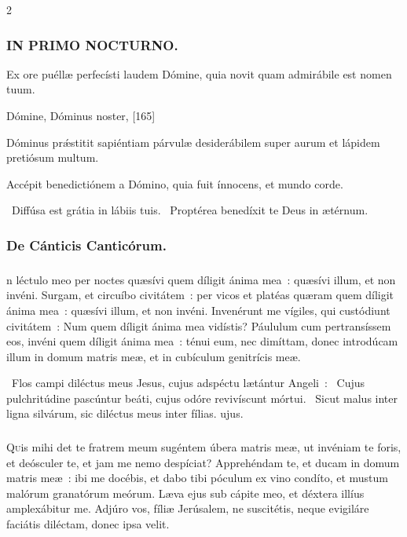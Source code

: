 \documentclass[9pt,twoside]{extarticle}
\begin{document}
\begin{multicols}{2}
{\subsubsection*{\center \textsc{IN PRIMO NOCTURNO.}}
\begin{tightlist}{}
\item {} Ex ore puéllæ perfecísti laudem Dómine, quia novit quam admirábile est nomen tuum.
\item {} Dómine, Dóminus noster,  [165]
\item {} Dóminus prǽstitit sapiéntiam párvulæ desiderábilem super aurum et lápidem pretiósum multum.
\item {} Accépit benedictiónem a Dómino, quia fuit ínnocens, et mundo corde.
\item {}~Diffúsa est grátia in lábiis tuis. ~Proptérea benedíxit te Deus in ætérnum.
\item {}
\end{tightlist}

\subsubsection*{\center De Cánticis Canticórum.}
\subsubsection*{\center {}}
n léctulo meo per noctes quæsívi quem díligit ánima mea~: quæsívi illum, et non invéni. Surgam, et circuíbo civitátem~: per vicos et platéas quæram quem díligit ánima mea~: quæsívi illum, et non invéni. Invenérunt me vígiles, qui custódiunt civitátem~: Num quem díligit ánima mea vidístis? Páululum cum pertransíssem eos, invéni quem díligit ánima mea~: ténui eum, nec dimíttam, donec introdúcam illum in domum matris meæ, et in cubículum genitrícis meæ.

\begin{tightlist}{}
\item {}~Flos campi diléctus meus Jesus, cujus adspéctu lætántur Angeli~: \textred{*}~Cujus pulchritúdine pascúntur beáti, cujus odóre revivíscunt mórtui. ~Sicut malus inter ligna silvárum, sic diléctus meus inter fílias. ujus.
\end{tightlist}

\subsubsection*{\center {}}
\lettrine{Q}uis mihi det te fratrem meum sugéntem úbera matris meæ, ut invéniam te foris, et deósculer te, et jam me nemo despíciat? Apprehéndam te, et ducam in domum matris meæ~: ibi me docébis, et dabo tibi póculum ex vino condíto, et mustum malórum granatórum meórum. Læva ejus sub cápite meo, et déxtera illíus amplexábitur me. Adjúro vos, fíliæ Jerúsalem, ne suscitétis, neque evigiláre faciátis diléctam, donec ipsa velit.

}
\end{multicols}
\end{document}
